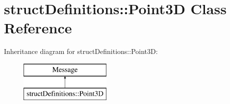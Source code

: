 \hypertarget{classstruct_definitions_1_1_point3_d}{}\section{struct\+Definitions\+:\+:Point3D Class Reference}
\label{classstruct_definitions_1_1_point3_d}
Inheritance diagram for struct\+Definitions\+:\+:Point3D\+:\begin{figure}[H]
\begin{center}
\leavevmode
\includegraphics[height=2.000000cm]{classstruct_definitions_1_1_point3_d}
\end{center}
\end{figure}

